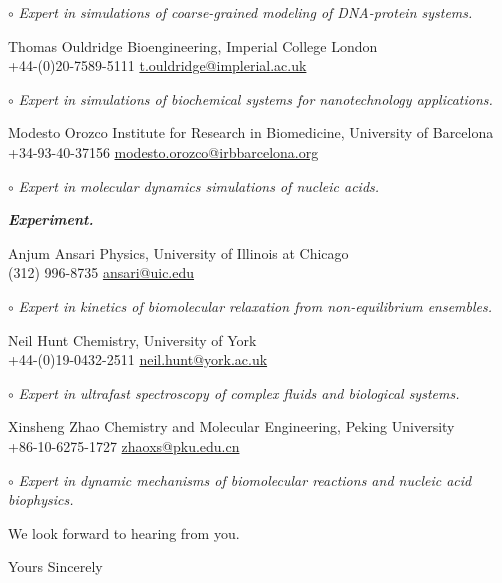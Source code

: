 \documentclass[11pt,a4paper]{letter} %
\begin{document}
\begin{letter}
$\circ$ \textit{Expert in simulations of coarse-grained modeling of DNA-protein systems.}

Thomas Ouldridge \hfill  Bioengineering, Imperial College London \\
+44-(0)20-7589-5111 \hfill \url{t.ouldridge@implerial.ac.uk}

$\circ$ \textit{Expert in simulations of biochemical systems for nanotechnology applications.}

Modesto Orozco \hfill  Institute for Research in Biomedicine, University of Barcelona \\
+34-93-40-37156 \hfill \url{modesto.orozco@irbbarcelona.org}

$\circ$ \textit{Expert in molecular dynamics simulations of nucleic acids.}

\textbf{\textit{Experiment.}}

Anjum Ansari \hfill Physics, University of Illinois at Chicago\\
(312) 996-8735 \hfill \url{ansari@uic.edu}

$\circ$ \textit{Expert in kinetics of biomolecular relaxation from non-equilibrium ensembles.}

Neil Hunt \hfill Chemistry, University of York \\
+44-(0)19-0432-2511 \hfill \url{neil.hunt@york.ac.uk}

$\circ$ \textit{Expert in ultrafast spectroscopy of complex fluids and biological systems.}

Xinsheng Zhao \hfill Chemistry and Molecular Engineering, Peking University \\
+86-10-6275-1727 \hfill \url{zhaoxs@pku.edu.cn}

$\circ$ \textit{Expert in dynamic mechanisms of biomolecular reactions and nucleic acid biophysics.}


We look forward to hearing from you.

\closing{Yours Sincerely}

\end{letter}




%
%
\end{document}
